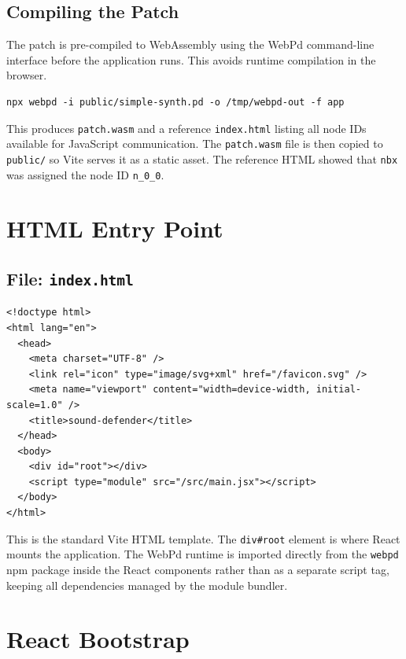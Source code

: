 \documentclass[12pt,a4paper]{article}
\begin{document}
\subsection{Compiling the Patch}

The patch is pre-compiled to WebAssembly using the WebPd command-line interface before the application runs. This avoids runtime compilation in the browser.

\begin{lstlisting}[style=pd, caption={Compiling the patch to WASM}]
npx webpd -i public/simple-synth.pd -o /tmp/webpd-out -f app
\end{lstlisting}

This produces \texttt{patch.wasm} and a reference \texttt{index.html} listing all node IDs available for JavaScript communication. The \texttt{patch.wasm} file is then copied to \texttt{public/} so Vite serves it as a static asset. The reference HTML showed that \texttt{nbx} was assigned the node ID \texttt{n\_0\_0}.

\section{HTML Entry Point}

\subsection{File: \texttt{index.html}}

\begin{lstlisting}[style=html, caption={index.html}]
<!doctype html>
<html lang="en">
  <head>
    <meta charset="UTF-8" />
    <link rel="icon" type="image/svg+xml" href="/favicon.svg" />
    <meta name="viewport" content="width=device-width, initial-scale=1.0" />
    <title>sound-defender</title>
  </head>
  <body>
    <div id="root"></div>
    <script type="module" src="/src/main.jsx"></script>
  </body>
</html>
\end{lstlisting}

This is the standard Vite HTML template. The \texttt{div\#root} element is where React mounts the application. The WebPd runtime is imported directly from the \texttt{webpd} npm package inside the React components rather than as a separate script tag, keeping all dependencies managed by the module bundler.

\section{React Bootstrap}
\end{document}
